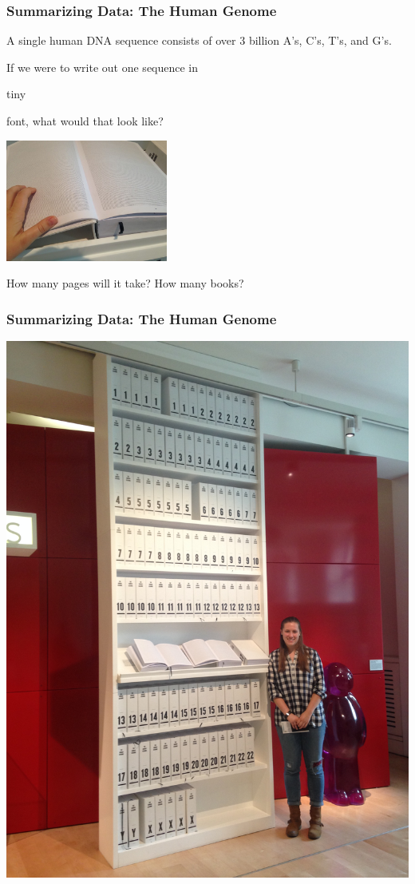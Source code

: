 \documentclass[12pt, 
hyperref={colorlinks=true, linkcolor=blue, urlcolor=cyan}]{beamer}
\begin{document}
\begin{frame}
\frametitle{Summarizing Data: The Human Genome}

A single human DNA sequence consists of over 3 billion A's, C's, T's, and G's. 

If we were to write out one sequence in \begin{tiny} tiny \end{tiny} font, what would that look like? \vspace{-0.3cm}

\center \includegraphics[height=4cm]{./book}

How many pages will it take? How many books?
\end{frame}

\begin{frame}
\frametitle{Summarizing Data: The Human Genome}

\vspace{-0.4cm}
\center \includegraphics[height=0.65\textheight, angle = 270]{./bookcase}

\end{frame}
\end{document}
